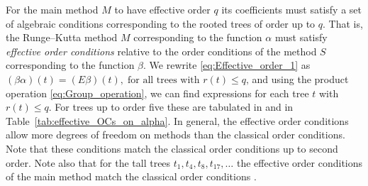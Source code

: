 For the main method $M$ to have effective order $q$ its coefficients must satisfy a set of algebraic conditions corresponding to the rooted trees of order up to $q$.
That is, the Runge--Kutta method $M$ corresponding to the function $\alpha$ must satisfy
\emph{effective order conditions} relative to the order conditions of the
method $S$ corresponding to the function $\beta$.
We rewrite \eqref{eq:Effective_order_1} as
$(\beta\alpha)(t) = (E\beta)(t), \; \text{for all trees with $r(t) \leq q$,}$
and using the product operation \eqref{eq:Group_operation}, we can find expressions for each tree $t$ with $r(t) \leq q$.
For trees up to order five these are tabulated in \cite[Sec~389]{Butcher2008_book}
and in Table~\ref{tab:effective_OCs_on_alpha}.
In general, the effective order conditions allow more degrees of
freedom on methods than the classical order conditions.
Note that these conditions match the classical order conditions up to
second order.
Note also that for the tall trees $t_1, t_4, t_8, t_{17}, \dots$ the
effective order conditions of the main method match the classical
order conditions \cite{Butcher2008_book}.
